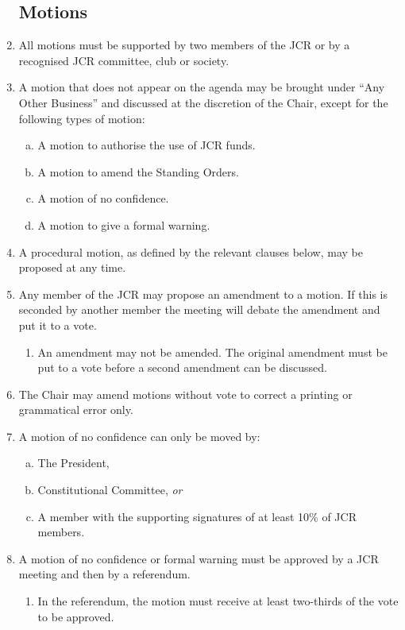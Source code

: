\documentclass[12pt]{article}
\begin{document}
\begin{enumerate}
    \subsection{Motions}
    \item All motions must be supported by two members of the JCR or by a recognised JCR committee, club or society.
    \item A motion that does not appear on the agenda may be brought under “Any Other Business” and discussed at the discretion of the Chair, except for the following types of motion:
    \begin{enumerate}[(a)]
        \item A motion to authorise the use of JCR funds.
        \item A motion to amend the Standing Orders.
        \item A motion of no confidence.
        \item A motion to give a formal warning.
    \end{enumerate}
    \item A procedural motion, as defined by the relevant clauses below, may be proposed at any time.
    \item Any member of the JCR may propose an amendment to a motion. If this is seconded by another member the meeting will debate the amendment and put it to a vote.
    \begin{enumerate}
        \item An amendment may not be amended. The original amendment must be put to a vote before a second amendment can be discussed.
    \end{enumerate}
    \item The Chair may amend motions without vote to correct a printing or grammatical error only.
    \item A motion of no confidence can only be moved by:
    \begin{enumerate}[(a)]
        \item The President,
        \item Constitutional Committee, \emph{or}
        \item A member with the supporting signatures of at least 10\% of JCR members.
    \end{enumerate}
    \item A motion of no confidence or formal warning must be approved by a JCR meeting and then by a referendum.
    \begin{enumerate}
        \item In the referendum, the motion must receive at least two-thirds of the vote to be approved.
    \end{enumerate}

\end{enumerate}
\end{document}
